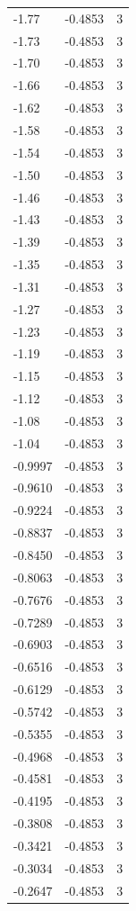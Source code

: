 \begin{longtable}{lrr}
  -1.77 & -0.4853 & 3 \\
  -1.73 & -0.4853 & 3 \\
  -1.70 & -0.4853 & 3 \\
  -1.66 & -0.4853 & 3 \\
  -1.62 & -0.4853 & 3 \\
  -1.58 & -0.4853 & 3 \\
  -1.54 & -0.4853 & 3 \\
  -1.50 & -0.4853 & 3 \\
  -1.46 & -0.4853 & 3 \\
  -1.43 & -0.4853 & 3 \\
  -1.39 & -0.4853 & 3 \\
  -1.35 & -0.4853 & 3 \\
  -1.31 & -0.4853 & 3 \\
  -1.27 & -0.4853 & 3 \\
  -1.23 & -0.4853 & 3 \\
  -1.19 & -0.4853 & 3 \\
  -1.15 & -0.4853 & 3 \\
  -1.12 & -0.4853 & 3 \\
  -1.08 & -0.4853 & 3 \\
  -1.04 & -0.4853 & 3 \\
  -0.9997 & -0.4853 & 3 \\
  -0.9610 & -0.4853 & 3 \\
  -0.9224 & -0.4853 & 3 \\
  -0.8837 & -0.4853 & 3 \\
  -0.8450 & -0.4853 & 3 \\
  -0.8063 & -0.4853 & 3 \\
  -0.7676 & -0.4853 & 3 \\
  -0.7289 & -0.4853 & 3 \\
  -0.6903 & -0.4853 & 3 \\
  -0.6516 & -0.4853 & 3 \\
  -0.6129 & -0.4853 & 3 \\
  -0.5742 & -0.4853 & 3 \\
  -0.5355 & -0.4853 & 3 \\
  -0.4968 & -0.4853 & 3 \\
  -0.4581 & -0.4853 & 3 \\
  -0.4195 & -0.4853 & 3 \\
  -0.3808 & -0.4853 & 3 \\
  -0.3421 & -0.4853 & 3 \\
  -0.3034 & -0.4853 & 3 \\
  -0.2647 & -0.4853 & 3 \\

\end{longtable}
